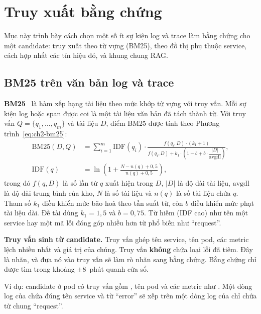 \section{Truy xuất bằng chứng}
\label{sec:ch2-truy-xuat}

Mục này trình bày cách chọn một số ít sự kiện log và trace làm bằng chứng cho một candidate: truy xuất theo từ vựng (BM25), theo đồ thị phụ thuộc service, cách hợp nhất các tín hiệu đó, và khung chung RAG.

\subsection{BM25 trên văn bản log và trace}
\label{sec:ch2-bm25}

\textbf{BM25}~\cite{robertson2009bm25} là hàm xếp hạng tài liệu theo mức khớp từ vựng với truy vấn. Mỗi sự kiện log hoặc span được coi là một tài liệu văn bản đã tách thành từ. Với truy vấn $Q = \{q_1, \dots, q_m\}$ và tài liệu $D$, điểm BM25 được tính theo Phương trình~\eqref{eq:ch2-bm25}:
\begin{align}
  \mathrm{BM25}(D, Q) &= \sum_{i=1}^{m} \mathrm{IDF}(q_i) \cdot
    \frac{f(q_i, D) \cdot (k_1 + 1)}{f(q_i, D) + k_1 \cdot \left(1 - b + b \cdot \dfrac{|D|}{\mathrm{avgdl}}\right)}, \nonumber \\
  \mathrm{IDF}(q) &= \ln\!\left(1 + \frac{N - n(q) + 0{,}5}{n(q) + 0{,}5}\right),
  \label{eq:ch2-bm25}
\end{align}
trong đó $f(q, D)$ là số lần từ $q$ xuất hiện trong $D$, $|D|$ là độ dài tài liệu, $\mathrm{avgdl}$ là độ dài trung bình của kho, $N$ là số tài liệu và $n(q)$ là số tài liệu chứa $q$. Tham số $k_1$ điều khiển mức bão hoà theo tần suất từ, còn $b$ điều khiển mức phạt tài liệu dài. Đề tài dùng $k_1 = 1{,}5$ và $b = 0{,}75$. Từ hiếm (IDF cao) như tên một service hay một mã lỗi đóng góp nhiều hơn từ phổ biến như ``request''.

\textbf{Truy vấn sinh từ candidate.} Truy vấn ghép tên service, tên pod, các metric lệch nhiều nhất và giá trị của chúng. Truy vấn \textbf{không} chứa loại lỗi đã tiêm. Đây là nhãn, và đưa nó vào truy vấn sẽ làm rò nhãn sang bằng chứng. Bằng chứng chỉ được tìm trong khoảng $\pm 8$~phút quanh cửa sổ.

Ví dụ: candidate ở pod  có truy vấn gồm , tên pod và các metric như . Một dòng log của  chứa đúng tên service và từ ``error'' sẽ xếp trên một dòng log  của  chỉ chứa từ chung ``request''.

